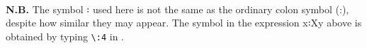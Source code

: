 \begin{code}
\>[0]\AgdaSpace{}%
\AgdaSymbol{:}\AgdaSpace{}%
\AgdaSymbol{\{}\AgdaSpace{}%
\AgdaSpace{}%
\AgdaSymbol{:}\AgdaSpace{}%
\AgdaSymbol{\}}\AgdaSpace{}%
\AgdaSymbol{(}\AgdaSpace{}%
\AgdaSymbol{:}\AgdaSpace{}%
\AgdaSpace{}%
\AgdaSpace{}%
\AgdaSymbol{)}\AgdaSpace{}%
\AgdaSymbol{(}\AgdaSpace{}%
\AgdaSymbol{:}\AgdaSpace{}%
\AgdaSpace{}%
\AgdaSpace{}%
\AgdaSpace{}%
\AgdaSpace{}%
\AgdaSymbol{)}\AgdaSpace{}%
\AgdaSpace{}%
\AgdaSpace{}%
\AgdaSpace{}%
\AgdaSpace{}%
\<%
\\
\>[0]\AgdaSpace{}%
\AgdaSpace{}%
\AgdaSpace{}%
\AgdaSymbol{=}\AgdaSpace{}%
\AgdaSpace{}%
\<%
\\
\>[0]\AgdaSpace{}%
\AgdaSpace{}%
\AgdaSpace{}%
\AgdaSymbol{(}\AgdaSpace{}%
\AgdaSpace{}%
\AgdaSpace{}%
\AgdaSymbol{)}\AgdaSpace{}%
\AgdaSymbol{=}\AgdaSpace{}%
\AgdaSpace{}%
\AgdaSpace{}%
\AgdaSpace{}%
\AgdaSpace{}%
\AgdaFunction{,}\AgdaSpace{}%
\<%
\\
\>[0]\AgdaSpace{}%
\AgdaSpace{}%
\<%
\end{code}%
\ccpad
\textbf{N.B.} The symbol ꞉ used here is not the same as the ordinary colon symbol (:), despite how similar they may appear. The symbol in the expression \ab x꞉\ab X\AgdaComma{}\ab y above is obtained by typing \texttt{\textbackslash{}:4} in \agdatwomode.

